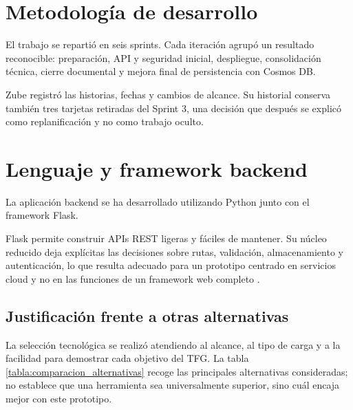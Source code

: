 
\section{Metodología de desarrollo}

El trabajo se repartió en seis sprints. Cada iteración agrupó un resultado reconocible: preparación, API y seguridad inicial, despliegue, consolidación técnica, cierre documental y mejora final de persistencia con Cosmos DB.

Zube registró las historias, fechas y cambios de alcance. Su historial conserva también tres tarjetas retiradas del Sprint 3, una decisión que después se explicó como replanificación y no como trabajo oculto.

\section{Lenguaje y framework backend}

La aplicación backend se ha desarrollado utilizando Python junto con el framework Flask.

Flask permite construir APIs REST ligeras y fáciles de mantener. Su núcleo reducido deja explícitas las decisiones sobre rutas, validación, almacenamiento y autenticación, lo que resulta adecuado para un prototipo centrado en servicios cloud y no en las funciones de un framework web completo \cite{flask_documentation}.

\subsection{Justificación frente a otras alternativas}

La selección tecnológica se realizó atendiendo al alcance, al tipo de carga y a la facilidad para demostrar cada objetivo del TFG. La tabla \ref{tabla:comparacion_alternativas} recoge las principales alternativas consideradas; no establece que una herramienta sea universalmente superior, sino cuál encaja mejor con este prototipo.

